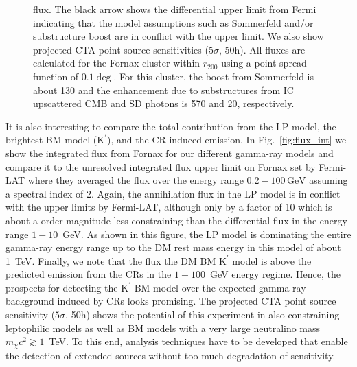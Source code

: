 \documentclass[10pt,aps,pra,reprint,amsmath,amsfonts,amssymb,showpacs,nofootinbib,floatfix]{revtex4-1}
\newcommand{\rmn}{\mathrm}
\newcommand{\Kp}{\rmn{K}^\prime}
\newcommand{\gev}{\rmn{GeV}}
\newcommand{\rvir}{r_{200}}
\begin{document}
\begin{figure}
\begin{minipage}{2.0\columnwidth}
{  flux. The black arrow shows the differential upper limit from Fermi
  \protect \cite{2010ApJ...717L..71A} indicating that the model
  assumptions such as Sommerfeld and/or substructure boost are in
  conflict with the upper limit. We also show projected CTA point
  source sensitivities ($5\sigma$, 50h).  All fluxes are calculated
  for the Fornax cluster within $\rvir$ using a point spread function
  of $0.1\deg$. For this cluster, the boost from Sommerfeld is about
  130 and the enhancement due to substructures from IC upscattered CMB
  and SD photons is 570 and 20, respectively.}
 \label{fig:IR_comp}
\end{minipage}
\end{figure}

It is also interesting to compare the total contribution from the LP
model, the brightest BM model ($\Kp$), and the CR induced emission. In
Fig.~\ref{fig:flux_int} we show the integrated flux from Fornax for
our different gamma-ray models and compare it to the unresolved
integrated flux upper limit on Fornax set by Fermi-LAT where they
averaged the flux over the energy range $0.2-100\,\gev$ assuming a
spectral index of 2. Again, the annihilation flux in the LP model is
in conflict with the upper limits by Fermi-LAT, although only by a
factor of 10 which is about a order magnitude less constraining than
the differential flux in the energy range $1-10$~GeV. As shown in this
figure, the LP model is dominating the entire gamma-ray energy range
up to the DM rest mass energy in this model of about 1~TeV. Finally,
we note that the flux the DM BM $\Kp$ model is above the predicted
emission from the CRs in the $1-100$~GeV energy regime. Hence, the
prospects for detecting the $\Kp$ BM model over the expected gamma-ray
background induced by CRs looks promising. The projected CTA point
source sensitivity ($5\sigma$, 50h) shows the potential of this
experiment in also constraining leptophilic models as well as BM
models with a very large neutralino mass $m_\chi c^2 \gtrsim
1$~TeV. To this end, analysis techniques have to be developed that
enable the detection of extended sources without too much degradation
of sensitivity.
\end{document}
